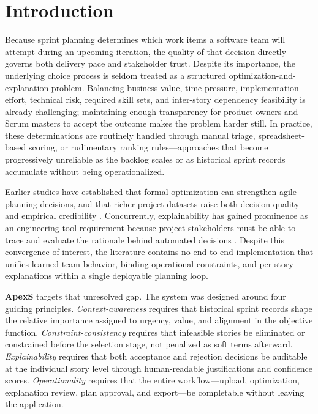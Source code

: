 \documentclass[conference]{IEEEtran}
\begin{document}
\section{Introduction}
\label{sec:intro}

Because sprint planning determines which work items a software team will attempt
during an upcoming iteration, the quality of that decision directly governs
both delivery pace and stakeholder trust.
Despite its importance, the underlying choice process is seldom treated as a
structured optimization-and-explanation problem.
Balancing business value, time pressure, implementation effort, technical risk,
required skill sets, and inter-story dependency feasibility is already challenging;
maintaining enough transparency for product owners and Scrum masters to accept the
outcome makes the problem harder still.
In practice, these determinations are routinely handled through manual triage,
spreadsheet-based scoring, or rudimentary ranking rules---approaches that become
progressively unreliable as the backlog scales or as historical sprint records
accumulate without being operationalized.

Earlier studies have established that formal optimization can strengthen agile
planning decisions, and that richer project datasets raise both decision quality and
empirical credibility \cite{ase2024, agile-mo, tawos, jira-dataset}.
Concurrently, explainability has gained prominence as an engineering-tool requirement
because project stakeholders must be able to trace and evaluate the rationale behind
automated decisions \cite{xai-slr-se, xai-survey, explanation-matters}.
Despite this convergence of interest, the literature contains no end-to-end
implementation that unifies learned team behavior, binding operational constraints,
and per-story explanations within a single deployable planning loop.

\textbf{ApexS} targets that unresolved gap.
The system was designed around four guiding principles.
\emph{Context-awareness} requires that historical sprint records shape the relative
importance assigned to urgency, value, and alignment in the objective function.
\emph{Constraint-consistency} requires that infeasible stories be eliminated or
constrained before the selection stage, not penalized as soft terms afterward.
\emph{Explainability} requires that both acceptance and rejection decisions be
auditable at the individual story level through human-readable justifications and
confidence scores.
\emph{Operationality} requires that the entire workflow---upload, optimization,
explanation review, plan approval, and export---be completable without leaving the
application.
\end{document}
